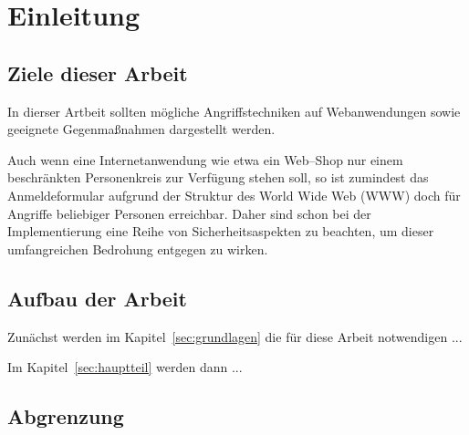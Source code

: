 \section{Einleitung}
\label{sec:einleitung}


\subsection{Ziele dieser Arbeit}

In dierser Artbeit sollten mögliche Angriffstechniken auf Webanwendungen 
sowie geeignete Gegenmaßnahmen dargestellt werden.

Auch wenn eine Internetanwendung wie etwa ein Web--Shop nur einem beschränkten Personenkreis zur Verfügung stehen soll,
so ist zumindest das Anmeldeformular aufgrund der Struktur des World Wide Web (\ac{WWW}) doch für Angriffe beliebiger Personen erreichbar.
Daher sind schon bei der Implementierung eine Reihe von Sicherheitsaspekten zu beachten, um dieser umfangreichen Bedrohung entgegen zu wirken.

\subsection{Aufbau der Arbeit}

Zunächst werden im Kapitel~\ref{sec:grundlagen} die für diese Arbeit notwendigen ...

Im Kapitel~\ref{sec:hauptteil} werden dann ...

\subsection{Abgrenzung}

